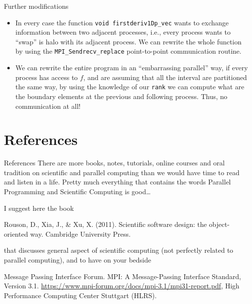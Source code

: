 \documentclass[xcolor={svgnames,usenames}]{beamer}
\begin{document}
\begin{frame}{Further modifications}
\begin{itemize}
\item In every case the function \texttt{void firstderiv1Dp_vec} wants to exchange
information between two adjacent processes, i.e., every process wants to ``swap'' is halo with its adjacent process. We can rewrite the whole function by using the \texttt{MPI_Sendrecv_replace} point-to-point communication routine.
\item We can rewrite the entire program in an ``embarrassing parallel'' way, if every process has access to $f$, and are assuming that all the interval are partitioned the same way, by using the knowledge of our \texttt{rank} we can compute what are the boundary elements at the previous and following process. Thus, no communication at all!
\end{itemize}
\vfill
{}
\end{frame}

\section{References}

\begin{frame}{References}
There are more books, notes, tutorials, online courses and oral tradition on scientific and parallel computing than we would have time to read and listen in a life. Pretty much everything that contains the words Parallel Programming and Scientific Computing is good\ldots 

I suggest here the book
\begin{thebibliography}{10}
	 Rouson, D., Xia, J., \& Xu, X. (2011). Scientific software design: the object-oriented way. Cambridge University Press.
\end{thebibliography}
that discusses general aspect of scientific computing (not perfectly related to parallel computing), and to have on your bedside
\begin{thebibliography}{10}
	  Message Passing Interface Forum. MPI: A Message-Passing Interface Standard, Version 3.1. \url{https://www.mpi-forum.org/docs/mpi-3.1/mpi31-report.pdf}, High Performance Computing Center Stuttgart (HLRS).
\end{thebibliography}
\end{frame}
\end{document}
